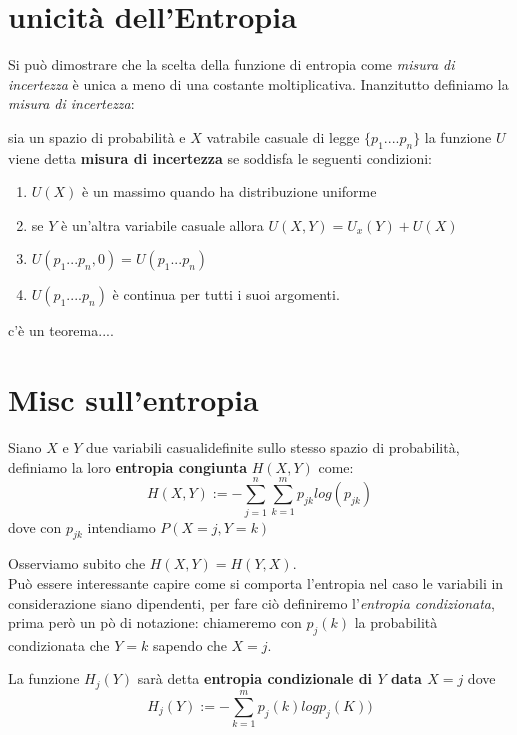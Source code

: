 \section{unicità dell'Entropia}
\label{sec:UniEntropia}
Si può dimostrare che la scelta della funzione di entropia come \textit{misura di incertezza} è unica a meno di una costante moltiplicativa. Inanzitutto definiamo la \textit{misura di incertezza}:
\begin{defi}
sia \spacep un spazio di probabilità e $X$ vatrabile casuale di legge $\{ p_1....p_n \}$ 
la funzione $U$ viene detta \textbf{misura di incertezza} se soddisfa le seguenti condizioni:
\begin{enumerate}
\item $U(X)$ è un massimo quando ha distribuzione uniforme
\item se $Y$ è un'altra variabile casuale allora $U(X,Y)=U_x(Y)+U(X)$
\item $U(p_1...p_n,0)=U(p_1...p_n)$
\item $U(p_1....p_n)$ è continua per tutti i suoi argomenti.
\end{enumerate}
\end{defi}
c'è un teorema....
\section{Misc sull'entropia}
\label{sec:miscEntropia}


\begin{defi}
Siano $X$ e $Y$ due variabili casualidefinite sullo stesso spazio di probabilità, definiamo la loro \textbf{entropia congiunta} $H(X,Y)$ come:
\begin{equation}\label{eq:congiun}
H(X,Y):=-\sum_{j=1}^n\sum_{k=1}^m p_{jk}log(p_{jk})
\end{equation}
dove con $p_{jk}$ intendiamo $P(X=j,Y=k)$
\end{defi}

Osserviamo subito che $H(X,Y)=H(Y,X)$.\\
Può essere interessante capire come si comporta l'entropia nel caso le variabili in considerazione siano dipendenti, per fare ciò definiremo l'\textit{entropia condizionata}, prima però un pò di notazione: chiameremo con $p_{j}(k)$ la probabilità condizionata che $Y=k$ sapendo che $X=j$.
\begin{defi}
La funzione $H_j(Y)$ sarà detta \textbf{entropia condizionale di $Y$ data $X=j$} dove
\begin{equation}\label{eq:6.6}
H_j(Y):=-\sum_{k=1}^m p_j(k)logp_j(K))
\end{equation}
\end{defi}

